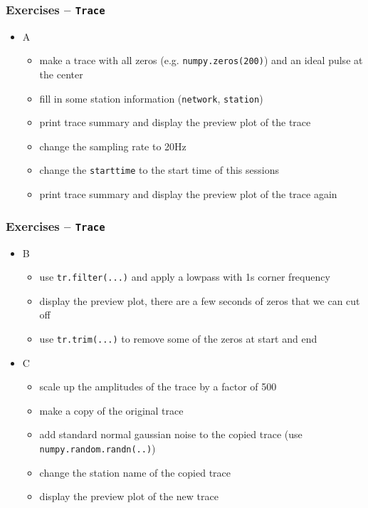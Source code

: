 \documentclass[t,10pt,compress=false,usepdftitle=false]{beamer}
\begin{document}
\begin{frame}[fragile]
    \frametitle{Exercises -- \tt{Trace}}
    \begin{itemize}
    \item A
        \begin{itemize}
        \item make a trace with all zeros (e.g. \verb#numpy.zeros(200)#) and an ideal pulse at the center
        \item fill in some station information (\verb#network#, \verb#station#)
        \item print trace summary and display the preview plot of the trace
        \item change the sampling rate to 20Hz
        \item change the \verb#starttime# to the start time of this sessions
        \item print trace summary and display the preview plot of the trace again
        \end{itemize}
    \end{itemize}
\end{frame}

\begin{frame}[fragile]
    \frametitle{Exercises -- \tt{Trace}}
    \begin{itemize}
    \item B
        \vspace*{0.5em}
        \begin{itemize}
        \item use \verb#tr.filter(...)# and apply a lowpass with 1s corner frequency
        \item display the preview plot, there are a few seconds of zeros that we can cut off
        \item use \verb#tr.trim(...)# to remove some of the zeros at start and end
        \end{itemize}
    \end{itemize}
    \begin{itemize}
    \item C
        \vspace*{0.5em}
        \begin{itemize}
        \item scale up the amplitudes of the trace by a factor of 500
        \item make a copy of the original trace
        \item add standard normal gaussian noise to the copied trace (use \verb#numpy.random.randn(..)#)
        \item change the station name of the copied trace
        \item display the preview plot of the new trace
        \end{itemize}
    \end{itemize}
\end{frame}
\end{document}
